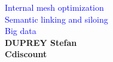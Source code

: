 \documentclass[a4, 14pts]{seminar}
\newcommand\eadsccr{\textsf{}\xspace}
\begin{document}
	    \begin{slide}
	    \thispagestyle{plain}
	    \begin{center}
	    \textcolor{blue}{\huge Internal mesh optimization}\\
	    \textcolor{blue}{\huge Semantic linking and siloing}\\
	    \textcolor{blue}{\huge Big data}\\
	    \vspace{0.25 cm}
	    \textbf{DUPREY Stefan}\\
	    \small{\textbf{Cdiscount}\\ 

	    }
	    \end{center}
	    \end{slide}
\end{document}
